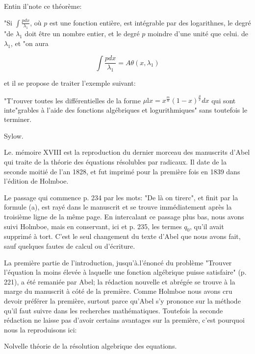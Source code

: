 \documentclass{article}
\begin{document}
Entin il'note ce théorème:

"Si \(\int \frac{p d x}{\lambda_{1}}\), où \(p\) est une fonction entière, est intégrable par des logarithnes, le degré "de \(\lambda_{1}\) doit être un nombre entier, et le degré \(p\) moindre d'une unité que celui. de \(\lambda_{1}\), et "on aura

\[
\int \frac{p d x}{\lambda_{1}}=A \theta\left(x, \lambda_{1}\right)
\]

et il se propose de traiter l'exemple suivant:

"T'rouver toutes les différentielles de la forme \(\mu \mathrm{l} x=x^{\frac{m}{n}}(1-x)^{\frac{\mu}{\nu}} d x\) qui sont inte"grables à l'aide des fonctions algébriques et logurithmiques" sans toutefois le terminer.

Sylow.

Le. mémoire XVIII est la reproduction du dernier morceau des manuscrits d'Abel qui traite de la théorie des équations résolubles par radicaux. Il date de la seconde moitié de l'an 1828, et fut imprimé pour la première fois en 1839 dans l'édition de Holmboe.

Le passage qui commence p. 234 par les mots: "De là on tirerc", et finit par la formule (a), est rayé dans le manuscrit et se trouve immédiatement après la troisième ligne de la même page. En intercalant ce passage plus bas, nous avons suivi Holmboe, mais en conservant, ici et p. 235, les termes \(q_{0}\), qu'il avait supprimé à tort. C'est le seul changement du texte d'Abel que nous avons fait, sauf quelques fautes de calcul ou d'écriture.

La première partie de l'introduction, jusqu'à.l'énoncé du problème "Trouver l'équation la moins élevée à laquelle une fonction algébrique puisse satisfaire" (p. 221), a été remaniée par Abel; la rédaction nouvelle et abrégée se trouve à la marge du manuscrit à cóté de la première. Comme Holmboe nous avons cru devoir préférer la première, surtout parce qu'Abel s'y prononce sur la méthode qu'il faut suivre dans les recherches mathématiques. Toutefois la seconde rédaction ne laisse pas d'avoir certains avantages sur la première, c'est pourquoi nous la reproduisons ici:

Nolvelle théorie de la résolution algebrique des equations.
\end{document}
